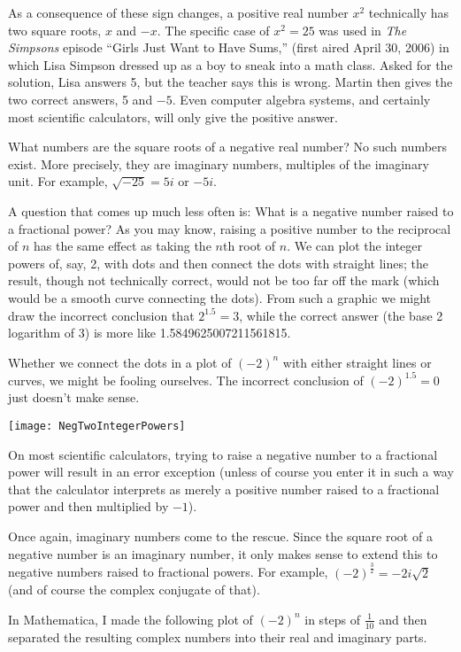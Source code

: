\documentclass[12pt]{article}
\begin{document}
As a consequence of these sign changes, a positive real number $x^2$ technically has two square roots, $x$ and $-x$. The specific case of $x^2 = 25$ was used in {\it The Simpsons} episode ``Girls Just Want to Have Sums,'' (first aired April 30, 2006) in which Lisa Simpson dressed up as a boy to sneak into a math class. Asked for the solution, Lisa answers 5, but the teacher says this is wrong. Martin then gives the two correct answers, 5 and $-5$. Even computer algebra systems, and certainly most scientific calculators, will only give the positive answer.

What numbers are the square roots of a negative real number? No such numbers exist. More precisely, they are imaginary numbers, multiples of the imaginary unit. For example, $\sqrt{-25} = 5i$ or $-5i$.

A question that comes up much less often is: What is a negative number raised to a fractional power? As you may know, raising a positive number to the reciprocal of $n$ has the same effect as taking the $n$th root of $n$. We can plot the integer powers of, say, 2, with dots and then connect the dots with straight lines; the result, though not technically correct, would not be too far off the mark (which would be a smooth curve connecting the dots). From such a graphic we might draw the incorrect conclusion that $2^{1.5} = 3$, while the correct answer (the base 2 logarithm of 3) is more like 1.5849625007211561815.

Whether we connect the dots in a plot of $(-2)^n$ with either straight lines or curves, we might be fooling ourselves. The incorrect conclusion of $(-2)^{1.5} = 0$ just doesn't make sense.

\begin{center}
\texttt{[image: NegTwoIntegerPowers]}
\end{center}

On most scientific calculators, trying to raise a negative number to a fractional power will result in an error exception (unless of course you enter it in such a way that the calculator interprets as merely a positive number raised to a fractional power and then multiplied by $-1$).

Once again, imaginary numbers come to the rescue. Since the square root of a negative number is an imaginary number, it only makes sense to extend this to negative numbers raised to fractional powers. For example, $(-2)^{\frac{3}{2}} = -2i\sqrt{2}$ (and of course the complex conjugate of that).

In Mathematica, I made the following plot of $(-2)^n$ in steps of $\frac{1}{10}$ and then separated the resulting complex numbers into their real and imaginary parts.
\end{document}
